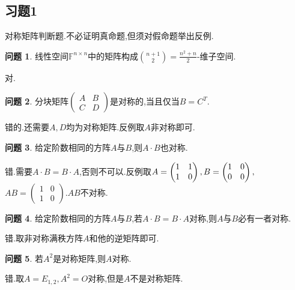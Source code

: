 \documentclass[11pt]{ctexart}
\theoremstyle{definition}
\newtheorem{qqq}{问题}[section]
\numberwithin{equation}{section}
\newcommand{\cnm}[2]{\binom{#1}{#2} }%
\begin{document}
\subsection{习题1}
对称矩阵判断题.不必证明真命题,但须对假命题举出反例.
\begin{qqq}
线性空间$\mathbb{F}^{n\times n}$中的矩阵构成$\cnm{n+1}{2}=\frac{n^2+n}{2}$-维子空间.
\end{qqq}
\begin{aaa}
    对.
\end{aaa}
\begin{qqq}
        分块矩阵$\begin{pmatrix}
            A&B\\C&D
        \end{pmatrix}$是对称的,当且仅当$B=C^T$.
\end{qqq}
\begin{aaa}
    错的.还需要$A,D$均为对称矩阵.反例取$A$非对称即可.
\end{aaa}
\begin{qqq}
    给定阶数相同的方阵$A$与$B$,则$A\cdot B$也对称.
\end{qqq}
\begin{aaa}
    错.需要$A\cdot B=B \cdot A$,否则不可以.反例取$A=\begin{pmatrix}
        1&1\\1&0
    \end{pmatrix},B=\begin{pmatrix}
        1&0\\0&0
    \end{pmatrix},\\$$AB=\begin{pmatrix}
        1&0\\1&0
    \end{pmatrix}.$$AB$不对称.
\end{aaa}
\begin{qqq}
    给定阶数相同的方阵$A$与$B$,若$A\cdot B=B\cdot A$对称,则$A$与$B$必有一者对称.
\end{qqq}
\begin{aaa}
    错.取非对称满秩方阵$A$和他的逆矩阵即可.
\end{aaa}
\begin{qqq}
    若$A^2$是对称矩阵,则$A$对称.
\end{qqq}
\begin{aaa}
    错.取$A=E_{1,2},A^2=O$对称,但是$A$不是对称矩阵.
\end{aaa}
\end{document}
